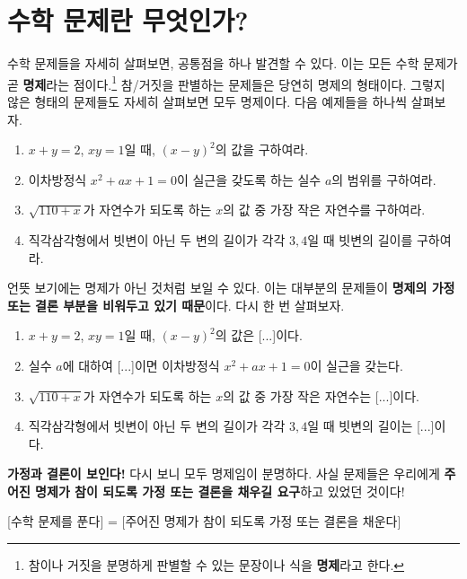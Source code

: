 \chapter{수학 문제란 무엇인가?}

수학 문제들을 자세히 살펴보면, 공통점을 하나 발견할 수 있다. 이는 모든 수학 문제가 곧 \textbf{명제}라는 점이다.\footnote{참이나 거짓을 분명하게 판별할 수 있는 문장이나 식을 \textbf{명제}라고 한다.} 참/거짓을 판별하는 문제들은 당연히 명제의 형태이다. 그렇지 않은 형태의 문제들도 자세히 살펴보면 모두 명제이다. 다음 예제들을 하나씩 살펴보자.

\bigskip

\begin{enumerate}
    \item \(x + y = 2\), \(xy = 1\)일 때, \((x - y)^2\)의 값을 구하여라.
    \item 이차방정식 \(x^2 + ax + 1 = 0\)이 실근을 갖도록 하는 실수 \(a\)의 범위를 구하여라.
    \item \(\sqrt{110+x}\)가 자연수가 되도록 하는 \(x\)의 값 중 가장 작은 자연수를 구하여라.
    \item 직각삼각형에서 빗변이 아닌 두 변의 길이가 각각 \(3, 4\)일 때 빗변의 길이를 구하여라.
\end{enumerate}

\bigskip

언뜻 보기에는 명제가 아닌 것처럼 보일 수 있다. 이는 대부분의 문제들이 \textbf{명제의 가정 또는 결론 부분을 비워두고 있기 때문}이다. 다시 한 번 살펴보자.

\bigskip

\begin{enumerate}
    \item \(x + y = 2\), \(xy = 1\)일 때, \((x - y)^2\)의 값은 [...]이다.
    \item 실수 \(a\)에 대하여 [...]이면 이차방정식 \(x^2 + ax + 1 = 0\)이 실근을 갖는다.
    \item \(\sqrt{110+x}\)가 자연수가 되도록 하는 \(x\)의 값 중 가장 작은 자연수는 [...]이다.
    \item 직각삼각형에서 빗변이 아닌 두 변의 길이가 각각 \(3, 4\)일 때 빗변의 길이는 [...]이다.
\end{enumerate}

\bigskip

\textbf{가정과 결론이 보인다!} 다시 보니 모두 명제임이 분명하다. 사실 문제들은 우리에게 \textbf{주어진 명제가 참이 되도록 가정 또는 결론을 채우길 요구}하고 있었던 것이다!

\begin{center}
    [수학 문제를 푼다] = [주어진 명제가 참이 되도록 가정 또는 결론을 채운다]
\end{center}

